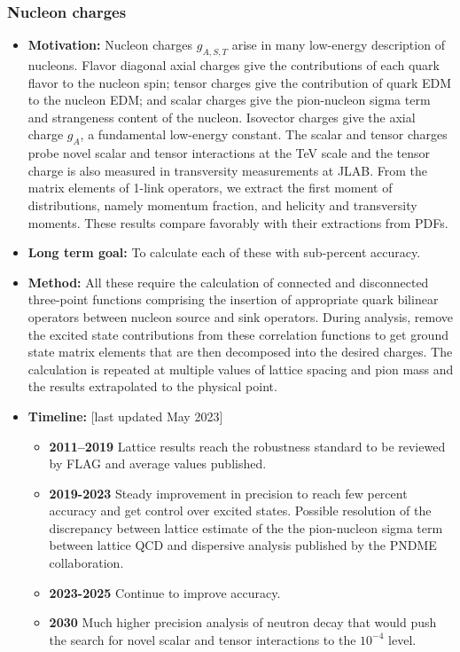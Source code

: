 \documentclass[12pt,hyperpdf]{article}
\begin{document}
\subsubsection{Nucleon charges}\label{sec:nuccharges}
\begin{itemize}
    \item{\bf Motivation:} Nucleon charges $g_{A,S,T}$ arise in many
      low-energy description of nucleons. Flavor diagonal axial
      charges give the contributions of each quark flavor to the
      nucleon spin; tensor charges give the contribution of quark EDM
      to the nucleon EDM; and scalar charges give the pion-nucleon sigma term and strangeness content of the nucleon. 
      Isovector charges give the axial charge $g_A$, a fundamental low-energy constant. The scalar and tensor 
      charges probe novel scalar and tensor interactions at the TeV scale and the tensor charge is also 
      measured in transversity measurements at JLAB. From the matrix elements of 1-link operators, we extract 
      the first moment of distributions, namely momentum fraction, and helicity and transversity moments. These 
      results compare favorably with their extractions from PDFs.
    \item{\bf Long term goal:} To calculate each of these with sub-percent accuracy. 
    \item{\bf Method:} All these require the calculation of connected and disconnected three-point
      functions comprising the insertion of appropriate quark bilinear operators between 
      nucleon source and sink operators. During analysis, remove the
      excited state contributions from these correlation functions to
      get ground state matrix elements that are then decomposed into
      the desired charges. The calculation is repeated at
      multiple values of lattice spacing and pion mass and the results
      extrapolated to the physical point.
\item{\bf Timeline:} \hfill [last updated May 2023]
\begin{itemize}
    \item{\bf 2011--2019} Lattice results reach the robustness standard to be reviewed by FLAG and average values published.
    \item{\bf 2019-2023} Steady improvement in precision to reach few  percent accuracy and get control over excited states. 
      Possible resolution of the discrepancy between lattice estimate of the the pion-nucleon sigma term between lattice QCD and 
      dispersive analysis published by the PNDME collaboration. 
    \item{\bf 2023-2025} Continue to improve accuracy. 
    \item{\bf 2030} Much higher precision analysis of neutron decay that
      would push the search for novel scalar and tensor interactions to the $10^{-4}$ level. 
\end{itemize}
\end{itemize}
\end{document}
